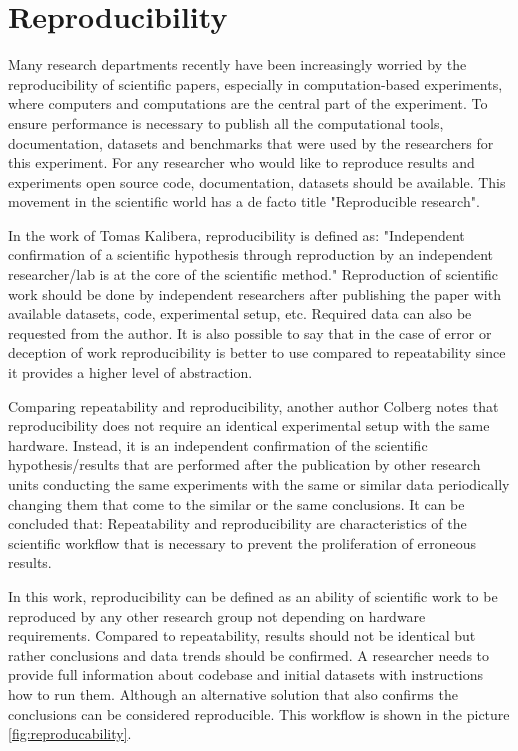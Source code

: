 \section{Reproducibility}
Many research departments recently have been increasingly worried by the reproducibility of scientific papers, especially in computation-based experiments, where computers and computations are the central part of the experiment. To ensure performance is necessary to publish all the computational tools, documentation, datasets and benchmarks that were used by the researchers for this experiment. For any researcher who would like to reproduce results and experiments open source code, documentation, datasets should be available. This movement in the scientific world has a de facto title "Reproducible research"\cite{DBLP:journals/jetai/Drummond18}. \par
In the work of Tomas Kalibera\cite{DBLP:conf/popl/Vitek15}, reproducibility is defined as: "Independent confirmation of a scientific hypothesis through reproduction by an independent researcher/lab is at the core of the scientific method." Reproduction of scientific work should be done by independent researchers after publishing the paper with available datasets, code, experimental setup, etc. Required data can also be requested from the author. It is also possible to say that in the case of error or deception of work reproducibility is better to use compared to repeatability since it provides a higher level of abstraction.\par
Comparing repeatability and reproducibility, another author Colberg\cite{DBLP:journals/cacm/CollbergP16} notes that reproducibility does not require an identical experimental setup with the same hardware. Instead, it is an independent confirmation of the scientific hypothesis/results that are performed after the publication by other research units conducting the same experiments with the same or similar data periodically changing them that come to the similar or the same conclusions. It can be concluded that: Repeatability and reproducibility are characteristics of the scientific workflow that is necessary to prevent the proliferation of erroneous results. \par
In this work, reproducibility can be defined as an ability of scientific work to be reproduced by any other research group not depending on hardware requirements. Compared to repeatability, results should not be identical but rather conclusions and data trends should be confirmed. A researcher needs to provide full information about codebase and initial datasets with instructions how to run them. Although an alternative solution that also confirms the conclusions can be considered reproducible. This workflow is shown in the picture \ref{fig:reproducability}.\par
